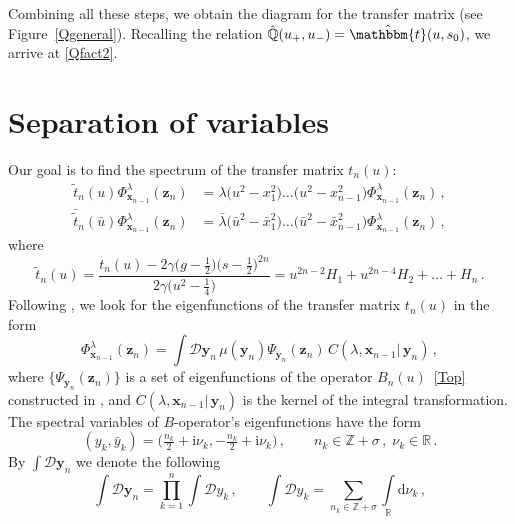 \documentclass[a4paper,11pt]{article}
\renewcommand{\imath}{\mathrm{i}}
\numberwithin{equation}{section}
\begin{document}
Combining all these steps, we obtain the diagram for the transfer matrix (see Figure~\ref{Qgeneral}). Recalling the relation $\hat{\mathbb{Q}}(u_+, u_-) = \hat{\mathbbm{t}}(u,s_0)$, we arrive at \eqref{Qfact2}.


\section{Separation of variables} \label{sect:SoV}

Our goal is to find the spectrum of the transfer matrix $t_n(u)$:
\begin{equation}\label{ep}
    \begin{aligned}
        \tilde{t}_n(u)\Phi_{\bm{x}_{n-1}}^{\lambda}(\bm{z}_{n}) 
        &= \lambda \bigl(u^2-x_1^2\bigr) \ldots \bigl(u^2-x_{n-1}^2\bigr) \Phi_{\bm{x}_{n-1}}^{\lambda}(\bm{z}_{n}) \,, \\
        \bar{\tilde{t}}_n(\bar{u})\Phi_{\bm{x}_{n-1}}^{\lambda}(\bm{z}_{n}) 
        &= \bar{\lambda} \bigl(\bar{u}^2-\bar{x}_1^2\bigr) \ldots \bigl(\bar{u}^2-\bar{x}_{n-1}^2\bigr) \Phi_{\bm{x}_{n-1}}^{\lambda}(\bm{z}_{n}) \,,
    \end{aligned}
\end{equation}
where
\begin{equation*}
    \tilde{t}_n(u) = \frac{t_n(u) - 2\gamma\bigl(g-\frac{1}{2}\bigr)\bigl(s-\frac{1}{2}\bigr)^{2n}}{2\gamma\bigl(u^{2}-\frac{1}{4}\bigr)} = u^{2n-2}H_1+u^{2n-4}H_2+\ldots+H_n \,.
\end{equation*}
Following \cite{IS}, we look for the eigenfunctions of the transfer matrix $t_n(u)$ in the form 
\begin{equation}\label{int}
    \Phi_{\bm{x}_{n-1}}^{\lambda}(\bm{z}_n) = \int \mathcal{D}\bm{y}_n \, \mu(\bm{y}_n) \Psi_{\bm{y}_n}(\bm{z}_n) \, C(\lambda, \bm{x}_{n-1}|\,\bm{y}_{n}) \,,
\end{equation}  
where $\{\Psi_{\bm{y}_n}(\bm{z}_n)\}$ is a set of eigenfunctions of the operator $B_n(u)$~\eqref{Top} constructed in \cite{ADV2}, and $C(\lambda, \bm{x}_{n-1}|\,\bm{y}_n)$ is the kernel of the integral transformation.
The spectral variables of $B$-operator's eigenfunctions have the form 
\begin{equation} \label{y}
	(y_k, \bar{y}_k) = \bigl(\tfrac{n_k}{2}+\imath\nu_k, -\tfrac{n_k}{2}+\imath\nu_k\bigr) \,, \qquad
	n_k \in \mathbb{Z}+\sigma \,, \; \nu_k \in \mathbb{R} \,.
\end{equation}
By $\int \mathcal{D}\bm{y}_n$ we denote the following
\begin{equation} \label{intx}
    \int \mathcal{D}\bm{y}_n = \prod\limits_{k=1}^{n}\int\mathcal{D}y_k \,, \qquad
    \int\mathcal{D}y_k = \sum\limits_{n_k\in\mathbb{Z}+\sigma}\int\limits_{\mathbb{R}}\mathrm{d}\nu_k \,,
\end{equation}
\end{document}
